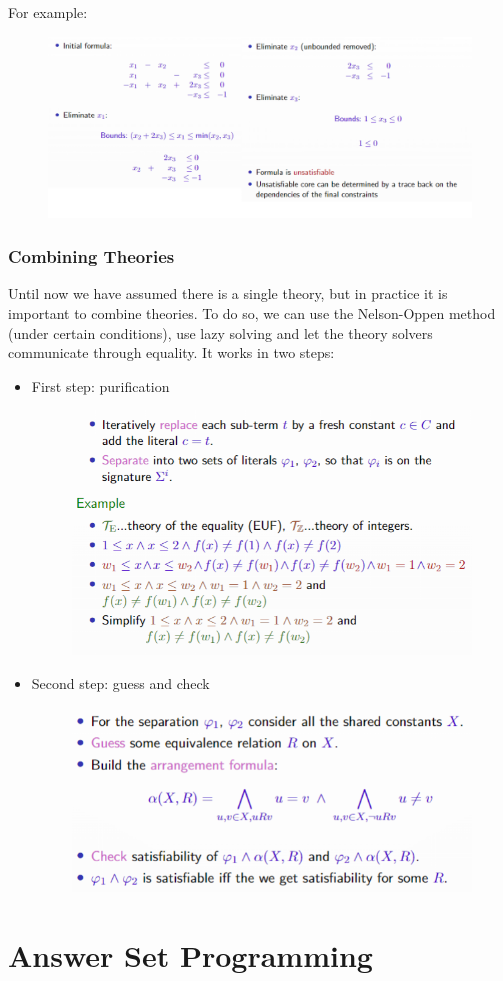 \documentclass[10pt,a4paper]{report}
\begin{document}
For example:
\begin{figure}[H]
    \centering
    \includegraphics[scale=0.5]{39.png}
\end{figure}
\subsection{Combining Theories}
Until now we have assumed there is a single theory, but in practice it is important to combine theories. To do so, we can use the Nelson-Oppen method (under certain conditions), use lazy solving and let the theory solvers communicate through equality. It works in two steps:
\begin{itemize}
    \item First step: puriﬁcation
    \begin{figure}[H]
        \centering
        \includegraphics[scale=0.5]{40.png}
    \end{figure}
    \item Second step: guess and check
    \begin{figure}[H]
        \centering
        \includegraphics[scale=0.5]{41.png}
    \end{figure}
\end{itemize}

\chapter{Answer Set Programming}
\end{document}
